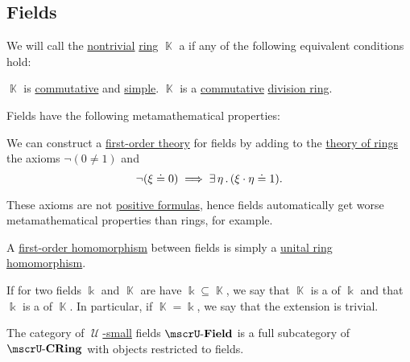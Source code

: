 \subsection{Fields}\label{subsec:fields}

\begin{definition}\label{def:field}
  We will call the \hyperref[def:ring/trivial]{nontrivial} \hyperref[def:ring]{ring} \( \BbbK \) a  if any of the following equivalent conditions hold:
  \begin{thmenum}
     \( \BbbK \) is \hyperref[def:ring/commutative]{commutative} and \hyperref[def:ring/simple]{simple}.
     \( \BbbK \) is a \hyperref[def:ring/commutative]{commutative} \hyperref[def:division_ring]{division ring}.
  \end{thmenum}

  Fields have the following metamathematical properties:
  \begin{thmenum}
     We can construct a \hyperref[def:first_order_theory]{first-order theory} for fields by adding to the \hyperref[def:semiring/theory]{theory of rings} the axioms \( \neg (0 \neq 1) \) and
    \begin{equation}\label{eq:def:field/theory/invertibility}
      \neg (\xi \doteq 0) \implies \exists \thinspace \eta \thinspace . \thinspace (\xi \cdot \eta \doteq 1).
    \end{equation}

    These axioms are not \hyperref[def:positive_formula]{positive formulas}, hence fields automatically get worse metamathematical properties than rings, for example.

     A \hyperref[def:first_order_homomorphism]{first-order homomorphism} between fields is simply a \hyperref[def:ring/homomorphism]{unital ring homomorphism}.

     If for two fields \( \Bbbk \) and \( \BbbK \) are have \( \Bbbk \subseteq \BbbK \), we say that \( \BbbK \) is a  of \( \Bbbk \) and that \( \Bbbk \) is a  of \( \BbbK \). In particular, if \( \BbbK = \Bbbk \), we say that the extension is trivial.

     The category of \hyperref[def:large_and_small_sets]{\( \mscrU \)-small} fields \( \ucat{Field} \) is a full subcategory of \hyperref[def:ring/category]{\( \ucat{CRing} \)} with objects restricted to fields.
  \end{thmenum}
\end{definition}
